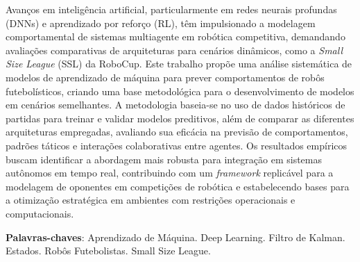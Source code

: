 \begin{resumo}



Avanços em inteligência artificial, particularmente em redes neurais profundas (DNNs) e aprendizado por reforço (RL), têm impulsionado a modelagem comportamental de sistemas multiagente em robótica competitiva, demandando avaliações comparativas de arquiteturas para cenários dinâmicos, como a \textit{Small Size League} (SSL) da RoboCup. Este trabalho propõe uma análise sistemática de modelos de aprendizado de máquina para prever comportamentos de robôs futebolísticos, criando uma base metodológica para o desenvolvimento de modelos em cenários semelhantes. A metodologia baseia-se no uso de dados históricos de partidas para treinar e validar modelos preditivos, além de comparar as diferentes arquiteturas empregadas, avaliando sua eficácia na previsão de comportamentos, padrões táticos e interações colaborativas entre agentes. Os resultados empíricos buscam identificar a abordagem mais robusta para integração em sistemas autônomos em tempo real, contribuindo com um \textit{framework} replicável para a modelagem de oponentes em competições de robótica e estabelecendo bases para a otimização estratégica em ambientes com restrições operacionais e computacionais.


 \vspace{\onelineskip}
    
 \noindent
 \textbf{Palavras-chaves}: Aprendizado de Máquina. Deep Learning. Filtro de Kalman. Estados. Robôs Futebolistas. Small Size League.
\end{resumo}
